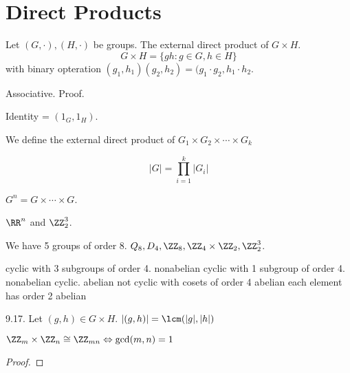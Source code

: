 \documentclass[class=scrartcl, crop=false]{standalone}
\begin{document}
\section{Direct Products}

Let $(G, \cdot), (H, \cdot)$ be groups. The external direct product of $G \times H$.
\[
  G \times H = \{gh: g \in G, h \in H\}
\]
with binary opteration $(g_1,h_1)(g_2,h_2) = (g_1\cdot g_2, h_1 \cdot h_2$.
\begin{note}
  Associative.
  Proof.
\end{note}
\begin{note}
  Identity = $(1_G, 1_H)$.
\end{note}

We define the external direct product of $G_1 \times G_2 \times \cdots \times G_k$
\begin{note}
  \[|G| = \prod_{i = 1}^{k} |G_i|\]
\end{note}

\begin{definition}
  $G^n = G \times \cdots \times G$. 
  \begin{example}
    $\RR^n$ and $\ZZ_2^3$.
  \end{example}
\end{definition}

We have 5 groups of order 8. $Q_8, D_4, \ZZ_8, \ZZ_4\times\ZZ_2, \ZZ_2^3$.
\begin{enumerate}
  \ii
  cyclic with 3 subgroups of order 4. nonabelian
  \ii
  cyclic with 1 subgroup of order 4. nonabelian
  \ii
  cyclic. abelian
  \ii
  not cyclic with cosets of order 4 abelian
  \ii
  each element has order 2 abelian
\end{enumerate}

\begin{theorem}
  9.17. Let $(g, h) \in G \times H$. $|(g, h)| = \lcm(|g|, |h|)$
\end{theorem}
\begin{example}
  
\end{example}
\begin{theorem}
  $\ZZ_m \times \ZZ_n \cong \ZZ_{mn} \Leftrightarrow  \gcd(m, n) = 1$
  \begin{proof}
    
  \end{proof}
\end{theorem}
\end{document}
